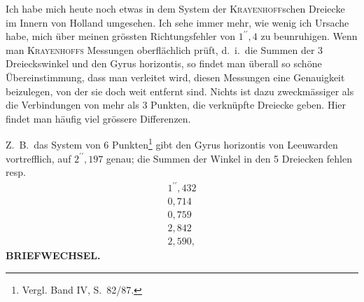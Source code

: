 Ich habe mich heute noch etwas in dem System der \textsc{Krayenhoff}schen
Dreiecke im Innern von Holland umgesehen. Ich sehe immer mehr, wie
wenig ich Ursache habe, mich über meinen grössten Richtungsfehler von $1^{\prime\prime}{,}4$
zu beunruhigen. Wenn man \textsc{Krayenhoffs} Messungen oberflächlich prüft, d.\ i.\
die Summen der 3 Dreieckswinkel und den Gyrus horizontis, so findet man
überall so schöne Übereinstimmung, dass man verleitet wird, diesen Messungen
eine Genauigkeit beizulegen, von der sie doch \textls[120]{sehr} weit entfernt sind. Nichts
ist dazu zweckmässiger als die Verbindungen von mehr als 3 Punkten, die
verknüpfte Dreiecke geben. Hier findet man häufig viel grössere Differenzen.
\begin{center}
\end{center}
\begingroup
\makeatletter
\renewcommand{\@makefnmark}{\hbox{\normalfont[\textsuperscript{*})]}}
\renewcommand{\@makefntext}[1]{\parindent1em\noindent\hbox to1.8em{\hss[\textsuperscript{*})\ }#1]}
\makeatother
\noindent Z.\ B.\ das System von 6 Punkten\footnote{Vergl. Band IV, S.\ 82/87.} gibt den Gyrus horizontis von Leeuwarden
vortrefflich, auf $2^{\prime\prime}{,}197$ genau; die Summen der Winkel in den 5 Dreiecken
fehlen resp.
\[
\begin{array}{r}
1^{\prime\prime}{,}432\\
0{,}714\\
0{,}759\\
2{,}842\\
2{,}590,
\end{array}
\]
\endgroup
\makeatletter
\def\ps@gaussIXfortyone{\def\@oddhead{}\def\@evenhead{}\def\@oddfoot{\small IX.\hfil41}\let\@evenfoot\@oddfoot}
\makeatother
\thispagestyle{gaussIXfortyone}
\clearpage
{}\hfill\textbf{BRIEFWECHSEL.}\par\medskip
